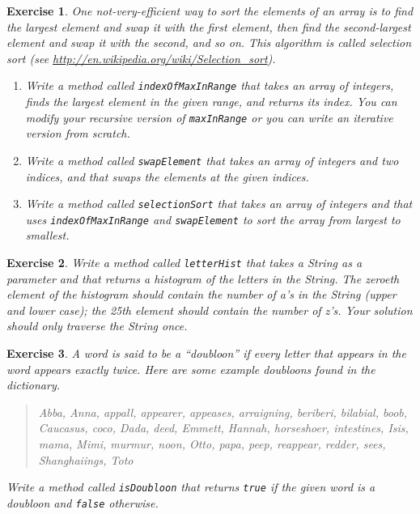 \documentclass[12pt]{book}
\theoremstyle{exercise}
\newtheorem{exercise}{Exercise}[chapter]
\newcommand{\java}[1]{\verb"#1"}
\newcommand{\java}[1]{\lstinline{#1}} %
\begin{document}
\begin{exercise}
One not-very-efficient way to sort the elements of an array is to find the largest element and swap it with the first element, then find the second-largest element and swap it with the second, and so on.
This algorithm is called selection sort (see \url{http://en.wikipedia.org/wiki/Selection_sort}).

\begin{enumerate}

\item Write a method called \java{indexOfMaxInRange} that takes an array of integers, finds the largest element in the given range, and returns its {\em index}.
You can modify your recursive version of \java{maxInRange} or you can write an iterative version from scratch.

\item Write a method called \java{swapElement} that takes an array of integers and two indices, and that swaps the elements at the given indices.

\item Write a method called \java{selectionSort} that takes an array of integers and that uses \java{indexOfMaxInRange} and \java{swapElement} to sort the array from largest to smallest.

\end{enumerate}
\end{exercise}


\begin{exercise}
Write a method called \java{letterHist} that takes a String as a parameter and that returns a histogram of the letters in the String.
The zeroeth element of the histogram should contain the number of a's in the String (upper and lower case); the 25th element should contain the number of z's.
Your solution should only traverse the String once.
\end{exercise}


\begin{exercise}
A word is said to be a ``doubloon'' if every letter that appears in the word appears exactly twice.
Here are some example doubloons found in the dictionary.

\begin{quote}
Abba, Anna, appall, appearer, appeases, arraigning, beriberi, bilabial, boob, Caucasus, coco, Dada, deed, Emmett, Hannah, horseshoer, intestines, Isis, mama, Mimi, murmur, noon, Otto, papa, peep, reappear, redder, sees, Shanghaiings, Toto
\end{quote}

Write a method called \java{isDoubloon} that returns \java{true} if the given word is a doubloon and \java{false} otherwise.
\end{exercise}
\end{document}
